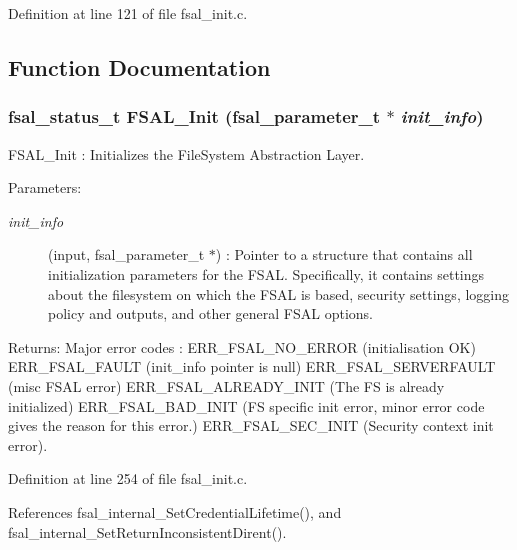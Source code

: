 Definition at line 121 of file fsal\_\-init.c.

\subsection{Function Documentation}
\subsubsection[{FSAL\_\-Init}]{\setlength{\rightskip}{0pt plus 5cm}fsal\_\-status\_\-t FSAL\_\-Init (fsal\_\-parameter\_\-t $\ast$ {\em init\_\-info})}\label{fsal__init_8c_0be44bf9d728985f8631b3aa8911b36f}


FSAL\_\-Init : Initializes the FileSystem Abstraction Layer.

\begin{Desc}
\item[Parameters:]
\begin{description}
\item[{\em init\_\-info}](input, fsal\_\-parameter\_\-t $\ast$) : Pointer to a structure that contains all initialization parameters for the FSAL. Specifically, it contains settings about the filesystem on which the FSAL is based, security settings, logging policy and outputs, and other general FSAL options.\end{description}
\end{Desc}
\begin{Desc}
\item[Returns:]Major error codes : ERR\_\-FSAL\_\-NO\_\-ERROR (initialisation OK) ERR\_\-FSAL\_\-FAULT (init\_\-info pointer is null) ERR\_\-FSAL\_\-SERVERFAULT (misc FSAL error) ERR\_\-FSAL\_\-ALREADY\_\-INIT (The FS is already initialized) ERR\_\-FSAL\_\-BAD\_\-INIT (FS specific init error, minor error code gives the reason for this error.) ERR\_\-FSAL\_\-SEC\_\-INIT (Security context init error). \end{Desc}


Definition at line 254 of file fsal\_\-init.c.

References fsal\_\-internal\_\-SetCredentialLifetime(), and fsal\_\-internal\_\-SetReturnInconsistentDirent().